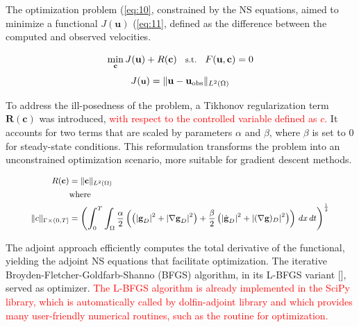 The optimization problem (\cref{eq:10}, constrained by the NS equations, aimed to minimize a functional $J(\mathbf{u})$ (\cref{eq:11}, defined as the difference between the computed and observed velocities. 

\begin{equation}
\small
\min_{\mathbf{c}} J(\mathbf{u}) + R(\mathbf{c}) \quad \text{s.t.} \quad F(\mathbf{u}, \mathbf{c}) = 0
\label{eq:10}
\end{equation}
\begin{equation}
\small
    J(\textbf{u}) = \| \mathbf{u} - \mathbf{u}_{\text{obs}} \|_{L^2(\Omega)}
    \label{eq:11}
\end{equation}

To address the ill-posedness of the problem, a Tikhonov regularization term $\textbf{R}(\textbf{c})$ was introduced, \textcolor{red}{with respect to the controlled variable defined as $c$.} It accounts for two terms that are scaled by parameters \(\alpha\) and \(\beta\), where \(\beta\) is set to $0$ for steady-state conditions. This reformulation transforms the problem into an unconstrained optimization scenario, more suitable for gradient descent methods. 

\begin{equation}
\small
    \begin{aligned}
        R(\mathbf{c}) &= \| \mathbf{c} \|_{L^2(\Omega)} \\
        &\text{where} \\
        \small
        \|c\|_{\Gamma \times (0, T]} &= \left( \int_0^T \int_{\Omega} \frac{\alpha}{2} \left( \left(|\textbf{g}_D|^2 + |\nabla \textbf{g}_D|^2 \right) + \frac{\beta}{2} \left( |\dot{\textbf{g}}_D|^2 +  |(\nabla \textbf{g})_D|^2 \right) \right) \, dx \, dt \right)^{\frac{1}{2}}
    \end{aligned}
    \label{eq:12} 
\end{equation}

The adjoint approach efficiently computes the total derivative of the functional, yielding the adjoint NS equations that facilitate optimization. The iterative Broyden-Fletcher-Goldfarb-Shanno (BFGS) algorithm, in its L-BFGS variant [\cite{Liu1989}], served as optimizer. \textcolor{red}{The L-BFGS algorithm is already implemented in the SciPy library, which is automatically
called by dolfin-adjoint library and which provides many user-friendly numerical routines, such as the routine for optimization.} 


